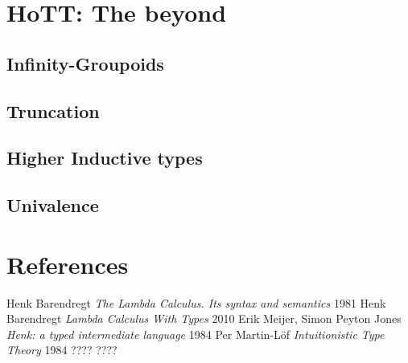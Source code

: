 \documentclass[11pt,oneside]{article}
\begin{document}
\section{HoTT: The beyond}
\subsection{Infinity-Groupoids}
\subsection{Truncation}
\subsection{Higher Inductive types}
\subsection{Univalence}

\newpage
\section{References}
\begin{thebibliography}{9}

      Henk Barendregt \textit{The Lambda Calculus. Its syntax and semantics} 1981
      Henk Barendregt \textit{Lambda Calculus With Types} 2010
       Erik Meijer, Simon Peyton Jones \textit{Henk: a typed intermediate language} 1984
        Per Martin-Löf \textit{Intuitionistic Type Theory} 1984
 ????
 ????

\end{thebibliography}
\end{document}
